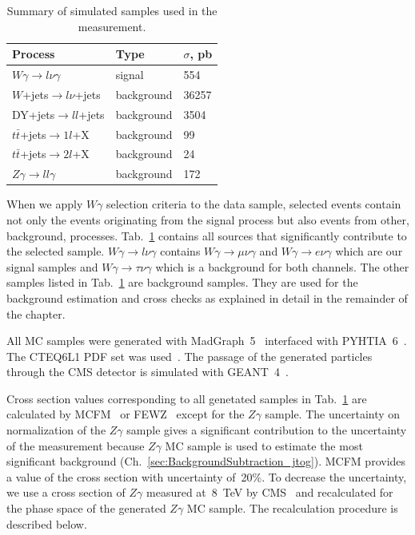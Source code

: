 \begin{table}[h]
  \small
  \begin{center}
    \caption{Summary of simulated samples used in the measurement.}
    \begin{tabular}{|l|l|l|}
      \hline
      Process                              & Type & $\sigma$, pb  \\ \hline
      $W\gamma \rightarrow l\nu\gamma$     & signal & 554   \\ \hline %
      $W$+jets$ \rightarrow l\nu $+jets   & background & 36257  \\ \hline %
      DY+jets$ \rightarrow ll $+jets     & background & 3504  \\ \hline %
      $t\bar{t}$+jets$\rightarrow 1l$+X    & background & 99    \\ \hline %
      $t\bar{t}$+jets$\rightarrow 2l$+X    & background & 24    \\ \hline
      $Z\gamma \rightarrow ll\gamma$       & background & 172   \\ \hline
    \end{tabular}
    \label{tab:mc_bkg_samples}
  \end{center}
\end{table} 

When we apply $W\gamma$ selection criteria to the data sample, selected events contain not only the events originating from the signal process but also events from other, background, processes. Tab.~\ref{tab:mc_bkg_samples} contains all sources that significantly contribute to the selected sample. $W\gamma \rightarrow l\nu\gamma$ contains $W\gamma \rightarrow \mu\nu\gamma$ and $W\gamma \rightarrow e\nu\gamma$ which are our signal samples and $W\gamma \rightarrow \tau\nu\gamma$ which is a background for both channels. The other samples listed in Tab.~\ref{tab:mc_bkg_samples} are background samples. They are used for the background estimation and cross checks as explained in detail in the remainder of the chapter. 

All MC samples were generated with MadGraph~5~\cite{ref_MadGraph} interfaced with PYHTIA~6~\cite{ref_Pythia}. The CTEQ6L1 PDF set was used~\cite{ref_CTEQ6L1}. The passage of the generated particles through the CMS detector is simulated with GEANT~4~\cite{ref_Geant4}. 

Cross section values corresponding to all genetated samples in Tab.~\ref{tab:mc_bkg_samples} are calculated by MCFM~\cite{ref_MCFM} or FEWZ~\cite{ref_FEWZ} except for the $Z\gamma$ sample. The uncertainty on normalization of the $Z\gamma$ sample gives a significant contribution to the uncertainty of the measurement because $Z\gamma$ MC sample is used to estimate the most significant background (Ch.~\ref{sec:BackgroundSubtraction_jtog}). MCFM provides a value of the cross section with uncertainty of~20\%. To decrease the uncertainty, we use a cross section of $Z\gamma$ measured at~8~TeV by CMS~\cite{ref_Zg8TeV} and recalculated for the phase space of the generated $Z\gamma$ MC sample. The recalculation procedure is described below.

